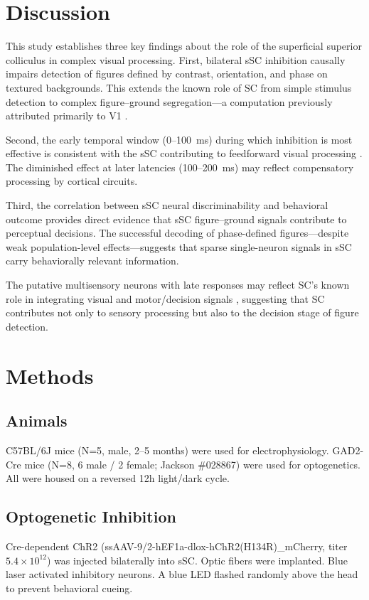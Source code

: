 \documentclass[11pt]{article}
\begin{document}
\section{Discussion}

This study establishes three key findings about the role of the superficial superior colliculus in complex visual processing. First, bilateral sSC inhibition causally impairs detection of figures defined by contrast, orientation, and phase on textured backgrounds. This extends the known role of SC from simple stimulus detection \citep{schneider1969two, dean1989visual} to complex figure--ground segregation---a computation previously attributed primarily to V1 \citep{lamme1995figure, wang2020v1}.

Second, the early temporal window (0--100~ms) during which inhibition is most effective is consistent with the sSC contributing to feedforward visual processing \citep{resulaj2018first}. The diminished effect at later latencies (100--200~ms) may reflect compensatory processing by cortical circuits.

Third, the correlation between sSC neural discriminability and behavioral outcome provides direct evidence that sSC figure--ground signals contribute to perceptual decisions. The successful decoding of phase-defined figures---despite weak population-level effects---suggests that sparse single-neuron signals in sSC carry behaviorally relevant information.

The putative multisensory neurons with late responses may reflect SC's known role in integrating visual and motor/decision signals \citep{wallace2004multisensory, krauzlis2013superior}, suggesting that SC contributes not only to sensory processing but also to the decision stage of figure detection.

\section{Methods}

\subsection{Animals}
C57BL/6J mice (N=5, male, 2--5 months) were used for electrophysiology. GAD2-Cre mice (N=8, 6 male / 2 female; Jackson \#028867) were used for optogenetics. All were housed on a reversed 12h light/dark cycle.

\subsection{Optogenetic Inhibition}
Cre-dependent ChR2 (ssAAV-9/2-hEF1a-dlox-hChR2(H134R)\_mCherry, titer $5.4 \times 10^{12}$) was injected bilaterally into sSC. Optic fibers were implanted. Blue laser activated inhibitory neurons. A blue LED flashed randomly above the head to prevent behavioral cueing.
\end{document}
